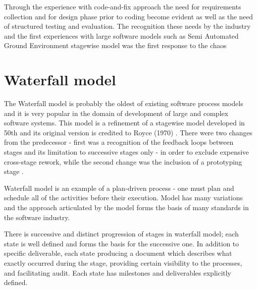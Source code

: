 Through the experience with code-and-fix approach the need for requirements collection and 
for design phase prior to coding become evident as well as the need of structured 
testing and evaluation. The recognition these needs by the industry and the first experiences
with large software models such as Semi Automated Ground Environment stagewise model was the first response to the chaos 

\section{Waterfall model}
The Waterfall model is probably the oldest of existing software process models and it is 
very popular in the domain of development of large and complex software systems. 
This model is a refinement of a stagewise model developed in 50th and its 
original version is credited to Royce (1970) \cite{citeulike:9982731}. There were two 
changes from the predecessor - first was a recognition of the feedback loops between 
stages and its limitation to successive stages only - in order to exclude expensive
cross-stage rework, while the second change was the inclusion of a prototyping stage
\cite{Boehm95anchoringthe}.

Waterfall model is an example of a plan-driven process - one must plan and schedule all 
of the activities before their execution. Model has many variations and the approach 
articulated by the model forms the basis of many standards in the software industry.

There is successive and distinct progression of stages in waterfall model; each state 
is well defined and forms the basis for the successive one. In addition to specific 
deliverable, each state producing a document which describes what exactly occurred 
during the stage, providing certain visibility to the processes, and facilitating 
audit. Each state has milestones and deliverables explicitly defined.

